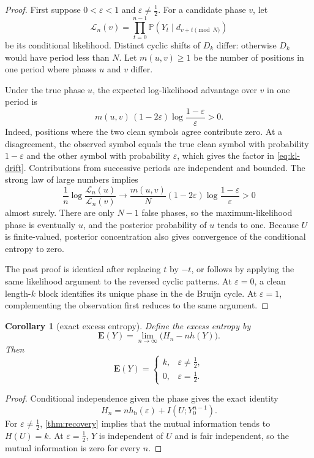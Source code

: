 \documentclass[11pt,a4paper]{amsart}
\newtheorem{corollary}[theorem]{Corollary}
\theoremstyle{definition}
\theoremstyle{remark}
\newcommand{\Prob}{\mathbb P}
\newcommand{\cL}{\mathcal L}
\newcommand{\hb}{h_{\mathrm b}}
\begin{document}
\begin{proof}
First suppose $0<\varepsilon<1$ and
$\varepsilon\neq\tfrac12$.  For a candidate phase $v$, let
\[
 \cL_n(v)
 =\prod_{t=0}^{n-1}
 \Prob(Y_t\mid d_{v+t\pmod N})
\]
be its conditional likelihood.  Distinct cyclic shifts of $D_k$ differ:
otherwise $D_k$ would have period less than $N$.  Let $m(u,v)\geq1$ be the
number of positions in one period where phases $u$ and $v$ differ.

Under the true phase $u$, the expected log-likelihood advantage over $v$ in
one period is
\begin{equation}\label{eq:kl-drift}
 m(u,v)\,(1-2\varepsilon)
 \log\frac{1-\varepsilon}{\varepsilon}>0.
\end{equation}
Indeed, positions where the two clean symbols agree contribute zero.  At a
disagreement, the observed symbol equals the true clean symbol with
probability $1-\varepsilon$ and the other symbol with probability
$\varepsilon$, which gives the factor in \eqref{eq:kl-drift}.  Contributions
from successive periods are independent and bounded.  The strong law of
large numbers implies
\[
 \frac1n\log\frac{\cL_n(u)}{\cL_n(v)}
 \longrightarrow
 \frac{m(u,v)}{N}(1-2\varepsilon)
 \log\frac{1-\varepsilon}{\varepsilon}>0
\]
almost surely.  There are only $N-1$ false phases, so the maximum-likelihood
phase is eventually $u$, and the posterior probability of $u$ tends to one.
Because $U$ is finite-valued, posterior concentration also gives convergence
of the conditional entropy to zero.

The past proof is identical after replacing $t$ by $-t$, or follows by
applying the same likelihood argument to the reversed cyclic patterns.
At $\varepsilon=0$, a clean length-$k$ block identifies its unique phase in
the de Bruijn cycle.  At $\varepsilon=1$, complementing the observation first
reduces to the same argument.
\end{proof}

\begin{corollary}[exact excess entropy]\label{cor:excess}
Define the excess entropy by
\[
 \mathbf E(Y)=\lim_{n\to\infty}\bigl(H_n-nh(Y)\bigr).
\]
Then
\[
 \mathbf E(Y)=
 \begin{cases}
 k,&\varepsilon\neq\tfrac12,\\
 0,&\varepsilon=\tfrac12.
 \end{cases}
\]
\end{corollary}

\begin{proof}
Conditional independence given the phase gives the exact identity
\[
 H_n=n\hb(\varepsilon)+I(U;Y_0^{n-1}).
\]
For $\varepsilon\neq\tfrac12$, \cref{thm:recovery} implies that the mutual
information tends to $H(U)=k$.  At $\varepsilon=\tfrac12$, $Y$ is
independent of $U$ and is fair independent, so the mutual information is
zero for every $n$.
\end{proof}
\end{document}
